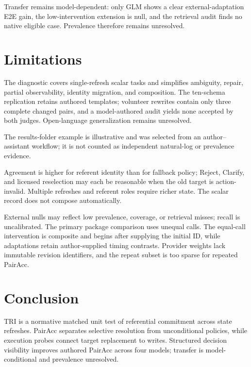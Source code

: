 \documentclass[letterpaper]{article}
\begin{document}
Transfer remains model-dependent: only GLM shows a clear external-adaptation E2E gain, the
low-intervention extension is null, and the retrieval audit finds no native eligible case.
Prevalence therefore remains unresolved.

\section{Limitations}

The diagnostic covers single-refresh scalar tasks and simplifies ambiguity, repair, partial
observability, identity migration, and composition. The ten-schema replication retains authored
templates; volunteer rewrites contain only three complete changed pairs, and a model-authored audit
yields none accepted by both judges. Open-language generalization remains unresolved.

The results-folder example is illustrative and was selected from an author--assistant workflow;
it is not counted as independent natural-log or prevalence evidence.

Agreement is higher for referent identity than for fallback policy; Reject, Clarify, and
licensed reselection may each be reasonable when the old target is action-invalid. Multiple
refreshes and referent roles require richer state. The scalar record does not compose automatically.

External nulls may reflect low prevalence, coverage, or retrieval misses; recall is uncalibrated.
The primary package comparison uses unequal calls. The equal-call intervention is composite and
begins after supplying the initial ID, while adaptations retain author-supplied timing contrasts.
Provider weights lack immutable revision identifiers, and the repeat subset is too sparse for
repeated PairAcc.

\section{Conclusion}

TRI is a normative matched unit test of referential commitment across state refreshes. PairAcc
separates selective resolution from unconditional policies, while execution probes connect target
replacement to writes. Structured decision visibility improves authored PairAcc across four
models; transfer is model-conditional and prevalence unresolved.

\clearpage
{\small

}
\end{document}
